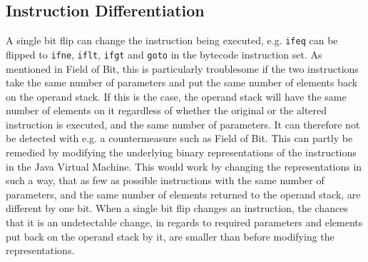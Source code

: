 \subsection{Instruction Differentiation} 
A single bit flip can change the instruction being executed, e.g. \texttt{ifeq} can be flipped to \texttt{ifne}, \texttt{iflt}, \texttt{ifgt} and \texttt{goto} in the \jc bytecode instruction set. As mentioned in Field of Bit, this is particularly troublesome if the two instructions take the same number of parameters and put the same number of elements back on the operand stack. If this is the case, the operand stack will have the same number of elements on it regardless of whether the original or the altered instruction is executed, and the same number of parameters. It can therefore not be detected with e.g. a countermeasure such as Field of Bit.
This can partly be remedied by modifying the underlying binary representations of the instructions in the Java Virtual Machine.
This would work by changing the representations in such a way, that as few as possible instructions with the same number of parameters, and the same number of elements returned to the operand stack, are different by one bit. 
When a single bit flip changes an instruction, the chances that it is an undetectable change, in regards to required parameters and elements put back on the operand stack by it, are smaller than before modifying the representations.

